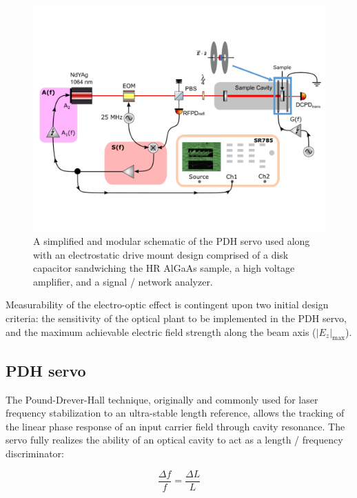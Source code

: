 \begin{figure}[H]
	\includegraphics[width=\textwidth]{figs/ALGAAS/algaas_pockels_effect_measurement_schematic.pdf}
	\caption{A simplified and modular schematic of the PDH servo used along with an electrostatic drive mount design comprised of a disk capacitor sandwiching the HR AlGaAs sample, a high voltage amplifier, and a signal / network analyzer.}
\label{fig:simplified_experiment_schema}
\end{figure}
 Measurability of the electro-optic effect is contingent upon two initial design criteria: the sensitivity of the optical plant to be implemented in the PDH servo, and the maximum achievable electric field strength along the beam axis ($|E_z|_\mathrm{max}$).

\subsection{PDH servo}\label{subsubsec:pdh}
The Pound-Drever-Hall technique, originally and commonly used for laser frequency stabilization to an ultra-stable length reference, allows the tracking of the linear phase response of an input carrier field through cavity resonance. The servo fully realizes the ability of an optical cavity to act as a length / frequency discriminator:

\begin{equation}\label{eq:cav_l_f}
	\frac{\Delta f}{f} = \frac{\Delta L}{L}
\end{equation}


